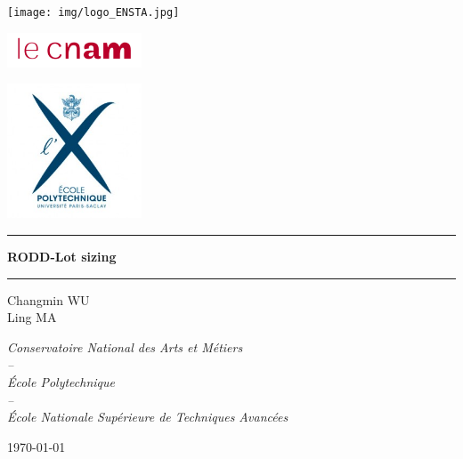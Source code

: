 \documentclass[12pt,a4paper]{article}
\begin{document}
\setcounter{page}{0}


\begin{center}

\begin{minipage}[l]{.2\linewidth}
	\flushleft\texttt{[image: img/logo\_ENSTA.jpg]}
\end{minipage}
\begin{minipage}[r]{.35\linewidth}
	\flushright\includegraphics[width=4cm]{img/logo_CNAM.png}
\end{minipage}
\begin{minipage}[r]{.3\linewidth}
	\flushright\includegraphics[width=4cm]{img/logo_X.jpg}
\end{minipage}
\vspace{1.5cm}

\hrule \vspace{0.5cm}
\begin{LARGE}
	\textbf{RODD-Lot sizing}\\
\end{LARGE}
\vspace{0.5cm} \hrule
\vspace{3cm}

\begin{Large}\color{carmine}
	Changmin WU\\
	Ling MA\\
\end{Large}
\vspace{5cm}

\begin{large}
	\textit{Conservatoire National des Arts et Métiers\\
	--\\
	\'Ecole Polytechnique\\
	--\\
	\'Ecole Nationale Supérieure de Techniques Avancées\\}
\end{large}
\vfill

\today
\end{center}
\end{document}
